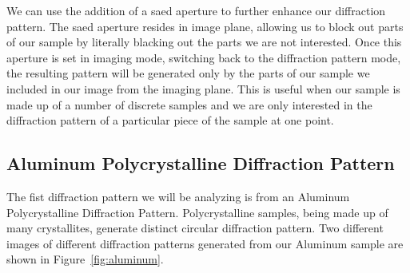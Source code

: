 \documentclass[12pt,a4paper]{article}
\begin{document}
We can use the addition of a \ac{saed} aperture to further enhance our diffraction pattern.  The \ac{saed} aperture resides in image plane, allowing us to block out parts of our sample by literally blacking out the parts we are not interested.  Once this aperture is set in imaging mode, switching back to the diffraction pattern mode, the resulting pattern will be generated only by the parts of our sample we included in our image from the imaging plane.  This is useful when our sample is made up of a number of discrete samples and we are only interested in the diffraction pattern of a particular piece of the sample at one point.


\subsection{Aluminum Polycrystalline Diffraction Pattern} %
\label{sub:poly}

The fist diffraction pattern we will be analyzing is from an Aluminum Polycrystalline Diffraction Pattern.  Polycrystalline samples, being made up of many crystallites, generate distinct circular diffraction pattern.  Two different images of different diffraction patterns generated from our Aluminum sample are shown in Figure~\ref{fig:aluminum}.
\end{document}
